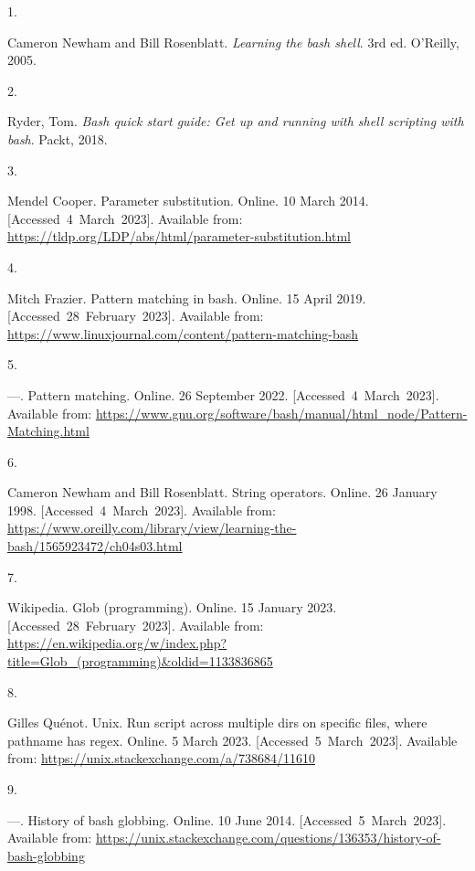 \documentclass[
  a4paper,
]{article}
\newlength{\cslhangindent}
\newlength{\csllabelwidth}
\newlength{\cslentryspacingunit} %
\newenvironment{CSLReferences}[2] %
 {%
  \setlength{\parindent}{0pt}
  \ifodd #1
  \let\oldpar\par
  \def\par{\hangindent=\cslhangindent\oldpar}
  \fi
  \setlength{\parskip}{#2\cslentryspacingunit}
 }%
 {}
\newcommand{\CSLLeftMargin}[1]{\parbox[t]{\csllabelwidth}{#1}}
\newcommand{\CSLRightInline}[1]{\parbox[t]{\linewidth - \csllabelwidth}{#1}\break}
\begin{document}
\hypertarget{refs}{}
\begin{CSLReferences}{0}{0}
\leavevmode{}%
\CSLLeftMargin{1. }%
\CSLRightInline{Cameron Newham and Bill Rosenblatt. \emph{Learning the
bash shell}. 3rd ed. O'Reilly, 2005. }

\leavevmode{}%
\CSLLeftMargin{2. }%
\CSLRightInline{Ryder, Tom. \emph{Bash quick start guide: Get up and
running with shell scripting with bash}. Packt, 2018. }

\leavevmode{}%
\CSLLeftMargin{3. }%
\CSLRightInline{Mendel Cooper. Parameter substitution. Online. 10 March
2014. {[}Accessed~4~March~2023{]}. Available from:
\url{https://tldp.org/LDP/abs/html/parameter-substitution.html}}

\leavevmode{}%
\CSLLeftMargin{4. }%
\CSLRightInline{Mitch Frazier. Pattern matching in bash. Online. 15
April 2019. {[}Accessed~28~February~2023{]}. Available from:
\url{https://www.linuxjournal.com/content/pattern-matching-bash}}

\leavevmode{}%
\CSLLeftMargin{5. }%
\CSLRightInline{---. Pattern matching. Online. 26 September 2022.
{[}Accessed~4~March~2023{]}. Available from:
\url{https://www.gnu.org/software/bash/manual/html_node/Pattern-Matching.html}}

\leavevmode{}%
\CSLLeftMargin{6. }%
\CSLRightInline{Cameron Newham and Bill Rosenblatt. String operators.
Online. 26 January 1998. {[}Accessed~4~March~2023{]}. Available from:
\url{https://www.oreilly.com/library/view/learning-the-bash/1565923472/ch04s03.html}}

\leavevmode{}%
\CSLLeftMargin{7. }%
\CSLRightInline{Wikipedia. Glob (programming). Online. 15 January 2023.
{[}Accessed~28~February~2023{]}. Available from:
\url{https://en.wikipedia.org/w/index.php?title=Glob_(programming)\&oldid=1133836865}}

\leavevmode{}%
\CSLLeftMargin{8. }%
\CSLRightInline{Gilles Quénot. Unix. Run script across multiple dirs on
specific files, where pathname has regex. Online. 5 March 2023.
{[}Accessed~5~March~2023{]}. Available from:
\url{https://unix.stackexchange.com/a/738684/11610}}

\leavevmode{}%
\CSLLeftMargin{9. }%
\CSLRightInline{---. History of bash globbing. Online. 10 June 2014.
{[}Accessed~5~March~2023{]}. Available from:
\url{https://unix.stackexchange.com/questions/136353/history-of-bash-globbing}}


\end{CSLReferences}
\end{document}
